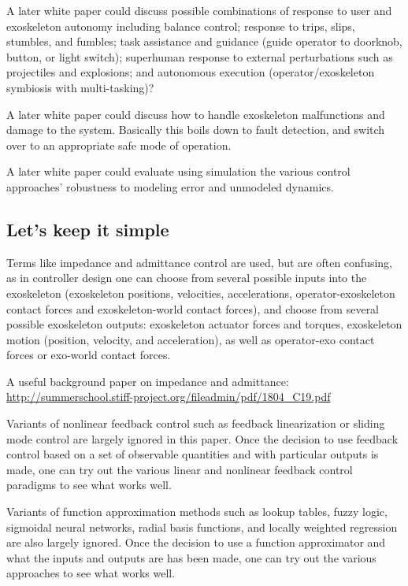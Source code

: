 \documentclass[letterpaper,12pt,fullpage]{article}
\begin{document}
A later white paper could discuss
possible combinations of response to user and exoskeleton
autonomy including balance control; response to trips, slips,
stumbles, and fumbles; task assistance and guidance (guide operator to
doorknob, button, or light switch); superhuman response to external
perturbations such as projectiles and explosions; and autonomous
execution (operator/exoskeleton symbiosis with multi-tasking)?

A later white paper could discuss how to handle exoskeleton
malfunctions and damage to the
system. Basically this boils down to fault detection, and switch over to
an appropriate safe mode of operation.

A later white paper could evaluate using simulation
the various control approaches' robustness to modeling error and unmodeled
dynamics.

\subsection{Let's keep it simple}

Terms like impedance and admittance control are used, but are often confusing,
as in controller design one can choose from several possible
inputs into the exoskeleton (exoskeleton positions,
velocities, accelerations, operator-exoskeleton contact forces and
exoskeleton-world contact forces), and choose from several possible exoskeleton
outputs: exoskeleton actuator forces and torques, exoskeleton
motion (position, velocity, and acceleration), as well as operator-exo
contact forces or exo-world contact forces.

A useful background paper on impedance and admittance:\\
\url{http://summerschool.stiff-project.org/fileadmin/pdf/1804_C19.pdf}

Variants of nonlinear feedback control such as feedback linearization or
sliding mode control are largely ignored in this paper.
Once the decision to use feedback control
based on a set of observable quantities and with particular outputs is made,
one can try out the various linear and nonlinear feedback control paradigms
to see what works well.

Variants of function approximation methods such as lookup tables, fuzzy logic,
sigmoidal neural networks, radial basis functions, and locally weighted regression
are also largely ignored. Once the decision to use a function approximator
and what the inputs and outputs are has been made, one can try out the various
approaches to see what works well.
\end{document}
